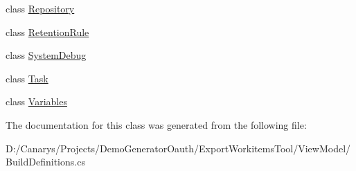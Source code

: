 \begin{DoxyCompactItemize}
\item 
class \mbox{\hyperlink{class_templates_generator_tool_1_1_view_model_1_1_build_definitions_1_1_repository}{Repository}}
\item 
class \mbox{\hyperlink{class_templates_generator_tool_1_1_view_model_1_1_build_definitions_1_1_retention_rule}{Retention\+Rule}}
\item 
class \mbox{\hyperlink{class_templates_generator_tool_1_1_view_model_1_1_build_definitions_1_1_system_debug}{System\+Debug}}
\item 
class \mbox{\hyperlink{class_templates_generator_tool_1_1_view_model_1_1_build_definitions_1_1_task}{Task}}
\item 
class \mbox{\hyperlink{class_templates_generator_tool_1_1_view_model_1_1_build_definitions_1_1_variables}{Variables}}
\end{DoxyCompactItemize}


The documentation for this class was generated from the following file\+:\begin{DoxyCompactItemize}
\item 
D\+:/\+Canarys/\+Projects/\+Demo\+Generator\+Oauth/\+Export\+Workitems\+Tool/\+View\+Model/Build\+Definitions.\+cs\end{DoxyCompactItemize}
